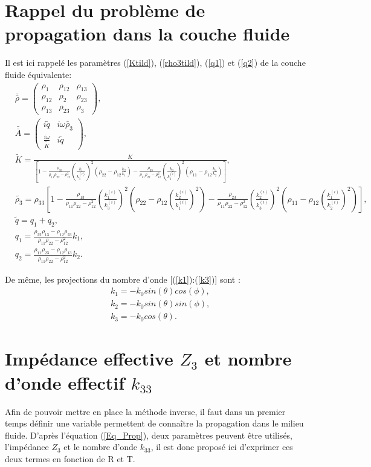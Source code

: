 \documentclass[twoside,openright]{report}
\begin{document}
\section{Rappel du problème de propagation dans la couche fluide}
\label{Ch_Inv_S_Pb}
    Il est ici rappelé  les paramètres (\ref{Ktild}), (\ref{rho3tild}), (\ref{q1}) et (\ref{q2})  de la couche fluide équivalente:
    \begin{align*}
	    &\bar{\bar{\rho}}=\begin{pmatrix} \rho_1 & \rho_{12} & \rho_{13} \\ \rho_{12} & \rho_2 & \rho_{23} \\ \rho_{13} & \rho_{23} & \rho_3 \end{pmatrix},\\
        &\bar{\bar{A}}=\begin{pmatrix} i \tilde{q} & i \omega \tilde{\rho_3} \\ \frac{i \omega}{\tilde{K}} & i \tilde{q} \end{pmatrix},\\
	    &\tilde{K}=\frac{K}{[1-\frac{\rho_{33}}{\rho_{11}\rho_{22}-\rho_{12}^2}(\frac{k_1}{k_3^{(i)}})^2(\rho_{22}-\rho_{12}\frac{k_2}{k_1})-\frac{\rho_{33}}{\rho_{11}\rho_{22}-\rho_{12}^2}(\frac{k_2}{k_3^{(i)}})^2(\rho_{11}-\rho_{12}\frac{k_1}{k_2})]},\\
        &\tilde{\rho_3}=\rho_{33}[1-\frac{\rho_{13}}{\rho_{11}\rho_{22}-\rho_{12}^2}(\frac{k_1^{(i)}}{k_3^{(i)}})^2(\rho_{22}-\rho_{12}(\frac{k_2^{(i)}}{k_1^{(i)}})^2)-\frac{\rho_{23}}{\rho_{11}\rho_{22}-\rho_{12}^2}(\frac{k_2^{(i)}}{k_3^{(i)}})^2(\rho_{11}-\rho_{12}(\frac{k_1^{(i)}}{k_2^{(i)}})^2)], \\
        &\tilde{q}=q_1+q_2,\\
	    &q_{1}=\frac{\rho_{22}\rho_{13}-\rho_{12}\rho_{23}}{\rho_{11}\rho_{22}-\rho_{12}^2}k_1,\\
        &q_{2}= \frac{\rho_{11}\rho_{23}-\rho_{12}\rho_{13}}{\rho_{11}\rho_{22}-\rho_{12}^2}k_2.
    \end{align*}
    
    De même, les projections du nombre d'onde [(\ref{k1}):(\ref{k3})] sont :
    \begin{align*}
    &k_1=-k_0 sin(\theta) cos(\phi), \\
    &k_2=-k_0 sin(\theta) sin(\phi), \\
    &k_3= -k_0 cos(\theta).
    \end{align*}
          
     
\section{Impédance effective $Z_3$ et nombre d'onde effectif $k_{33}$}
\label{Ch_Inv_S_Z3}
Afin de pouvoir mettre en place la méthode inverse, il faut dans un premier temps définir une variable permettent de connaître la propagation dans le milieu fluide. D'après l'équation (\ref{Eq_Prop}), deux paramètres peuvent être utilisés, l'impédance $Z_3$ et le nombre d'onde $k_{33}$, il est donc proposé ici d'exprimer ces deux termes en fonction de R et T.
    
\end{document}
